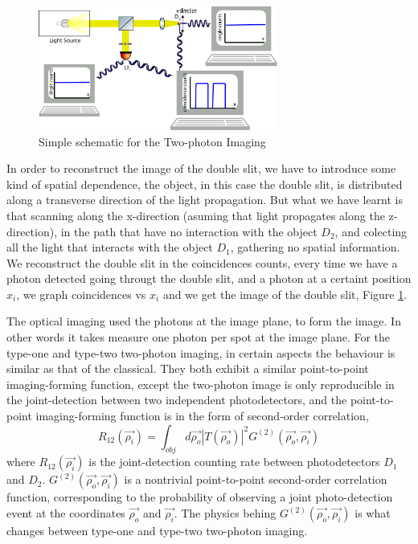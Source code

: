 \begin{figure}[h]
\centering
\includegraphics[width=0.7\textwidth]{Figures/twoPhotonSetup.png}
\caption{Simple schematic for the Two-photon Imaging} 
\label{fig:twoPhotonSetup}
\end{figure}
In order to reconstruct the image of the double slit, we have to introduce some kind of spatial dependence, the object, in this case the double slit, is distributed along a transverse direction of the light propagation. But what we have learnt is that scanning along the x-direction (asuming that light propagates along the z-direction), in the path that have no interaction with the object $D_2$, and colecting all the light that interacts with the object $D_1$, gathering no spatial information. We reconstruct the double slit in the coincidences counts, every time we have a photon detected going througt the double slit, and a photon at a certaint position $x_i$, we graph coincidences vs ${ x_i }$ and we get the image of the double slit, Figure \ref{fig:twoPhotonSetup}. 


The optical imaging used the photons at the image plane, to form the image. In other 
words it takes measure one photon per spot at the image plane. For the type-one and type-two
two-photon imaging, in certain aspects the behaviour is similar as that of the classical.
They both exhibit a similar point-to-point imaging-forming function, except the 
two-photon image is only reproducible in the joint-detection between two independent photodetectors,
and the point-to-point imaging-forming function is in the form of second-order correlation,
\begin{equation}
R_{12}(\vec{\rho_i})=\int_{obj} d\vec{\rho_o} |T(\vec{\rho_o})|^2 G^{(2)}(\vec{\rho_o},\vec{\rho_i})
\end{equation}
where $R_{12}(\vec{\rho_i})$ is the joint-detection counting rate between photodetectors $D_1$ and $D_2$.
$G^{(2)}(\vec{\rho_o},\vec{\rho_i})$ is a nontrivial point-to-point second-order correlation
function, corresponding to the probability of observing a joint photo-detection event
at the coordinates $\vec{\rho_o}$ and $\vec{\rho_i}$. The physics behing $G^{(2)}(\vec{\rho_o},\vec{\rho_i})$
is what changes between type-one and type-two two-photon imaging.

